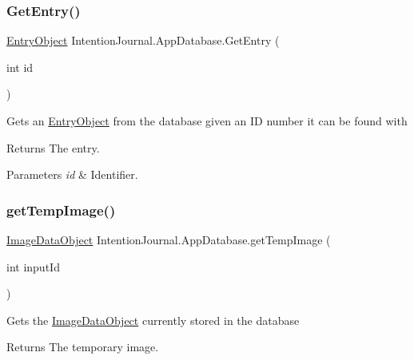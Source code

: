 \subsubsection{\texorpdfstring{Get\+Entry()}{GetEntry()}}
{\footnotesize\ttfamily \hyperlink{class_intention_journal_1_1_entry_object}{Entry\+Object} Intention\+Journal.\+App\+Database.\+Get\+Entry (\begin{DoxyParamCaption}\item[{int}]{id }\end{DoxyParamCaption})\hspace{0.3cm}{\ttfamily [inline]}}



Gets an \hyperlink{class_intention_journal_1_1_entry_object}{Entry\+Object} from the database given an ID number it can be found with 

\begin{DoxyReturn}{Returns}
The entry.
\end{DoxyReturn}

\begin{DoxyParams}{Parameters}
{\em id} & Identifier.\\
\hline
\end{DoxyParams}
\mbox{\label{class_intention_journal_1_1_app_database_a1f6754a18f434ae8bb7d2b5ec8eb7c19}} 
\subsubsection{\texorpdfstring{get\+Temp\+Image()}{getTempImage()}}
{\footnotesize\ttfamily \hyperlink{class_intention_journal_1_1_image_data_object}{Image\+Data\+Object} Intention\+Journal.\+App\+Database.\+get\+Temp\+Image (\begin{DoxyParamCaption}\item[{int}]{input\+Id }\end{DoxyParamCaption})\hspace{0.3cm}{\ttfamily [inline]}}



Gets the \hyperlink{class_intention_journal_1_1_image_data_object}{Image\+Data\+Object} currently stored in the database 

\begin{DoxyReturn}{Returns}
The temporary image.
\end{DoxyReturn}

